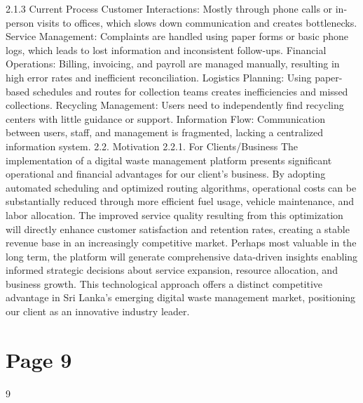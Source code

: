 \documentclass{article}
\begin{document}
    2.1.3 Current Process 
Customer Interactions: Mostly through phone calls or in-person visits to offices, which 
slows down communication and creates bottlenecks. 
Service Management: Complaints are handled using paper forms or basic phone logs, 
which leads to lost information and inconsistent follow-ups. 
Financial Operations: Billing, invoicing, and payroll are managed manually, resulting in 
high error rates and inefficient reconciliation. 
Logistics Planning: Using paper-based schedules and routes for collection teams creates 
inefficiencies and missed collections. 
Recycling Management: Users need to independently find recycling centers with little 
guidance or support. 
 Information Flow: Communication between users, staff, and management is 
fragmented, lacking a centralized information system. 
2.2. Motivation 
    2.2.1. For Clients/Business 
The implementation of a digital waste management platform presents significant 
operational and financial advantages for our client's business. By adopting automated 
scheduling and optimized routing algorithms, operational costs can be substantially 
reduced through more efficient fuel usage, vehicle maintenance, and labor allocation. 
The improved service quality resulting from this optimization will directly enhance 
customer satisfaction and retention rates, creating a stable revenue base in an 
increasingly competitive market. Perhaps most valuable in the long term, the platform 
will generate comprehensive data-driven insights enabling informed strategic decisions 
about service expansion, resource allocation, and business growth. This technological 
approach offers a distinct competitive advantage in Sri Lanka's emerging digital waste 
management market, positioning our client as an innovative industry leader. 

\section*{Page 9}
   
 
 9  
 
\end{document}
